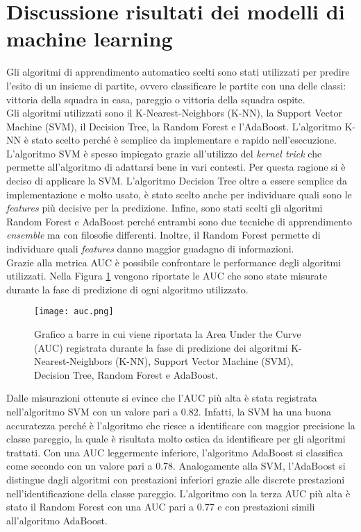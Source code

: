 \section{Discussione risultati dei modelli di machine learning}
Gli algoritmi di apprendimento automatico scelti sono stati utilizzati per predire l'esito di un insieme di partite, ovvero classificare le partite con una delle classi: vittoria della squadra in casa, pareggio o vittoria della squadra ospite.\\
Gli algoritmi utilizzati sono il K-Nearest-Neighbors (K-NN), la Support Vector Machine (SVM), il Decision Tree, la Random Forest e l'AdaBoost. L'algoritmo K-NN è stato scelto perché è semplice da implementare e rapido nell'esecuzione. L'algoritmo SVM è spesso impiegato grazie all'utilizzo del \emph{kernel trick} che permette all'algoritmo di adattarsi bene in vari contesti. Per questa ragione si è deciso di applicare la SVM. L'algoritmo Decision Tree oltre a essere semplice da implementazione e molto usato, è stato scelto anche per individuare quali sono le \emph{features} più decisive per la predizione. Infine, sono stati scelti gli algoritmi Random Forest e AdaBoost perché entrambi sono due tecniche di apprendimento \emph{ensemble} ma con filosofie differenti. Inoltre, il Random Forest permette di individuare quali \emph{features} danno maggior guadagno di informazioni.\\
Grazie alla metrica AUC è possibile confrontare le performance degli algoritmi utilizzati. Nella Figura \ref{fig:auc} vengono riportate le AUC che sono state misurate durante la fase di predizione di ogni algoritmo utilizzato.
\begin{figure}[h]
	\begin{center}
		\texttt{[image: auc.png]}
		\caption{Grafico a barre in cui viene riportata la Area Under the Curve (AUC) registrata durante la fase di predizione dei algoritmi K-Nearest-Neighbors (K-NN),  Support Vector Machine (SVM), Decision Tree, Random Forest e AdaBoost.  
		} 
		\label{fig:auc}
	\end{center}
\end{figure}
Dalle misurazioni ottenute si evince che l'AUC più alta è stata registrata nell'algoritmo SVM con un valore pari a 0.82. Infatti, la SVM ha una buona accuratezza perché è l'algoritmo che riesce a identificare con maggior precisione la classe pareggio, la quale è risultata molto ostica da identificare per gli algoritmi trattati. Con una AUC leggermente inferiore, l'algoritmo AdaBoost si classifica come secondo con un valore pari a 0.78. Analogamente alla SVM, l'AdaBoost si distingue dagli algoritmi con prestazioni inferiori grazie alle discrete prestazioni nell'identificazione della classe pareggio. L'algoritmo con la terza AUC più alta è stato il Random Forest con una AUC pari a 0.77 e con prestazioni simili all'algoritmo AdaBoost.
